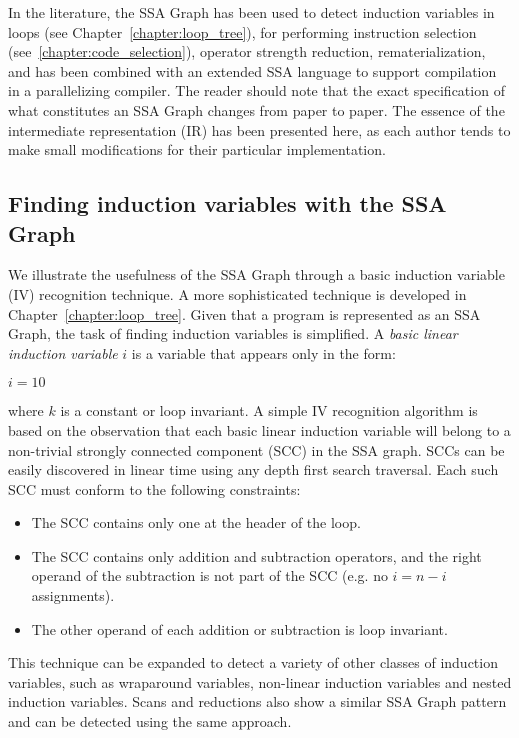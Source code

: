 In the literature, the SSA Graph has been used to detect induction variables in loops (see Chapter~\ref{chapter:loop_tree}), for performing instruction selection (see~\ref{chapter:code_selection}), operator strength reduction, rematerialization, and has been combined with an extended SSA language to support compilation in a parallelizing compiler. 
The reader should note that the exact specification of what constitutes an SSA Graph changes from paper to paper. 
The essence of the intermediate representation (IR) has been presented here, as each author tends to make small modifications for their particular implementation.

\subsection{Finding induction variables with the SSA Graph}
We illustrate the usefulness of the SSA Graph through a basic induction variable (IV) recognition technique. 
A more sophisticated technique is developed in Chapter~\ref{chapter:loop_tree}. 
Given that a program is represented as an SSA Graph, the task of finding induction variables is simplified. 
A \textit{basic linear induction variable} $i$ is a variable that appears only in the form:

\begin{algorithm}[H]
  $i=10$\;
\end{algorithm}
where $k$ is a constant or loop invariant. 
A simple IV recognition algorithm is based on the observation that each basic linear induction variable will belong to a non-trivial strongly connected component (SCC) in the SSA graph. 
SCCs can be easily discovered in linear time using any depth first search traversal. 
Each such SCC must conform to the following constraints:

\begin{itemize}
\item The SCC contains only one \phifun at the header of the loop.
\item The SCC contains only addition and subtraction operators, and the right operand of the subtraction is not part of the SCC (e.g. no $i=n-i$ assignments).
\item The other operand of each addition or subtraction is loop invariant.
\end{itemize}

This technique can be expanded to detect a variety of other classes of induction variables, such as wraparound variables, non-linear induction variables and nested induction variables. 
Scans and reductions also show a similar SSA Graph pattern and can be detected using the same approach.

